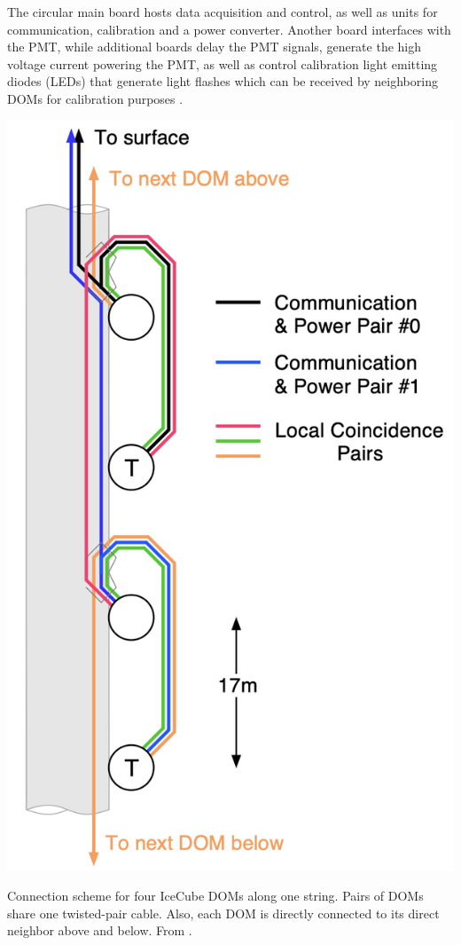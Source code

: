 \documentclass[
    a4paper, %
    fontsize=10pt, %
    twoside=true, %
    numbers=noenddot, %
    fontmethod=tex, %
]{kaobook}
\begin{document}
The circular main board hosts data acquisition and control, as well as units for communication, calibration and a power converter. Another board interfaces with the PMT, while additional boards delay the PMT signals, generate the high voltage current powering the PMT, as well as control calibration light emitting diodes (LEDs) that generate light flashes which can be received by neighboring DOMs for calibration purposes .
\begin{marginfigure}
    \includegraphics{ic_DOM_connections.png}
    \caption[IceCube DOM connections]{Connection scheme for four IceCube DOMs along one string. Pairs of DOMs share one twisted-pair cable. Also, each DOM is directly connected to its direct neighbor above and below. From \cite{Aartsen2017}.} 
\end{marginfigure}
\end{document}
